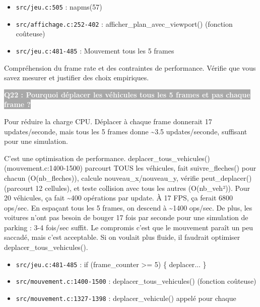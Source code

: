 \documentclass[12pt,a4paper]{article}
\newcommand{\question}[1]{%
    \vspace{0.5cm}
    \noindent\colorbox{darkgray}{\textcolor{white}{\textbf{#1}}}
    \vspace{0.3cm}
}
\begin{document}
\begin{reference_code}
\begin{itemize}
    \item \texttt{src/jeu.c:505} : napms(57)
    \item \texttt{src/affichage.c:252-402} : afficher\_plan\_avec\_viewport() (fonction coûteuse)
    \item \texttt{src/jeu.c:481-485} : Mouvement tous les 5 frames
\end{itemize}
\end{reference_code}

\begin{objectif_prof}
Compréhension du frame rate et des contraintes de performance. Vérifie que vous savez mesurer et justifier des choix empiriques.
\end{objectif_prof}

\question{Q22 : Pourquoi déplacer les véhicules tous les 5 frames et pas chaque frame ?}

\begin{reponse_courte}
Pour réduire la charge CPU. Déplacer à chaque frame donnerait 17 updates/seconde, mais tous les 5 frames donne \textasciitilde{}3.5 updates/seconde, suffisant pour une simulation.
\end{reponse_courte}

\begin{reponse_longue}
C'est une optimisation de performance. deplacer\_tous\_vehicules() (mouvement.c:1400-1500) parcourt TOUS les véhicules, fait suivre\_fleches() pour chacun (O(nb\_fleches)), calcule nouveau\_x/nouveau\_y, vérifie peut\_deplacer() (parcourt 12 cellules), et teste collision avec tous les autres (O(nb\_veh²)). Pour 20 véhicules, ça fait \textasciitilde{}400 opérations par update. À 17 FPS, ça ferait 6800 ops/sec. En espaçant tous les 5 frames, on descend à \textasciitilde{}1400 ops/sec. De plus, les voitures n'ont pas besoin de bouger 17 fois par seconde pour une simulation de parking : 3-4 fois/sec suffit. Le compromis c'est que le mouvement paraît un peu saccadé, mais c'est acceptable. Si on voulait plus fluide, il faudrait optimiser deplacer\_tous\_vehicules().
\end{reponse_longue}

\begin{reference_code}
\begin{itemize}
    \item \texttt{src/jeu.c:481-485} : if (frame\_counter >= 5) \{ deplacer... \}
    \item \texttt{src/mouvement.c:1400-1500} : deplacer\_tous\_vehicules() (fonction coûteuse)
    \item \texttt{src/mouvement.c:1327-1398} : deplacer\_vehicule() appelé pour chaque
\end{itemize}
\end{reference_code}
\end{document}

